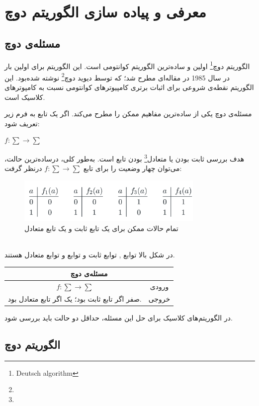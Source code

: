 \documentclass{book}
\begin{document}
\section{معرفی و پیاده سازی الگوریتم دوچ}

\subsection{مسئله‌ی دوچ}
الگوریتم دوچ\footnote{Deutsch algorithm} اولین و ساده‌ترین الگوریتم کوانتومی‌ است. این الگوریتم برای اولین بار در سال 1985 در مقاله‌ای مطرح شد؛ که توسط دیوید دوچ\footnote{} نوشته شده‌‌بود. این الگوریتم نقطه‌ی شروعی برای اثبات برتری کامپیوترهای کوانتومی نسبت به کامپوترهای کلاسیک است.

مسئله‌ی دوچ یکی از ساده‌ترین مفاهیم ممکن را مطرح می‌کند. اگر یک تابع به فرم زیر تعریف شود: 
\begin{center}
	$f : \sum \rightarrow \sum$
\end{center}
هدف بررسی ثابت بودن یا متعادل\footnote{} بودن تابع  است. 
به‌طور کلی، درساده‌ترین حالت، می‌توان چهار وضعیت را برای تابع $f : \sum \rightarrow \sum$ درنظر گرفت:\\
\begin{figure}[ht]
	\centering
	\includegraphics[width=0.8\textwidth]{Constantorbalanse.png}
	\caption{تمام حالات ممکن برای یک تابع ثابت و یک تابع متعادل}
\end{figure}\\
در شکل بالا توابع  ,  توابع ثابت و توابع  و  توابع متعادل هستند.
\begin{center}
\begin{tabular}{|c|c|}
	\hline
	\multicolumn{2}{|c|}{مسئله‌ی دوچ} \\
	\hline
	$f : \sum \rightarrow \sum$ & ورودی \\
	\hline
	صفر اگر تابع ثابت بود؛ یک اگر تابع متعادل بود.  & خروجی \\
	\hline
\end{tabular}
\end{center}
در الگوریتم‌های کلاسیک برای حل این مسئله، حداقل دو حالت باید بررسی شود.
\subsection{الگوریتم دوچ}
\end{document}
